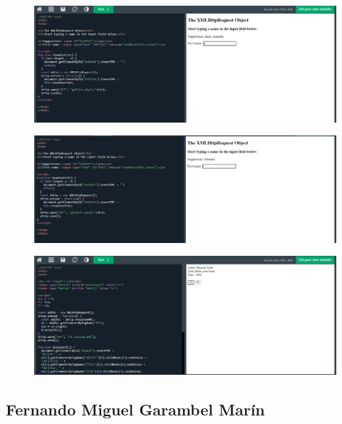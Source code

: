 \documentclass{article}
\begin{document}
\begin{itemize}
\begin{figure}[H]
			\centering
			\includegraphics[width=1.0\textwidth,keepaspectratio]{img/L15.jpg}
		\end{figure}
		\begin{figure}[H]
			\centering
			\includegraphics[width=1.0\textwidth,keepaspectratio]{img/L16.jpg}
		\end{figure}
		\begin{figure}[H]
			\centering
			\includegraphics[width=1.0\textwidth,keepaspectratio]{img/L17.jpg}
		\end{figure}		
	\end{itemize}
	
	\subsection{Fernando Miguel Garambel Marín}
\end{document}
